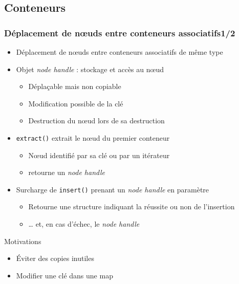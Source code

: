 \documentclass[C++.tex]{subfiles}
\begin{document}
\subsection*{Conteneurs}
\begin{frame}[fragile]
	\frametitle{Déplacement de nœuds entre conteneurs associatifs\titlehfill{}1/2}
	\begin{itemize}
		\item Déplacement de nœuds entre conteneurs associatifs de même type
		\item Objet \textit{node handle} : stockage et accès au nœud
		\begin{itemize}
			\item Déplaçable mais non copiable
			\item Modification possible de la clé
			\item Destruction du nœud lors de sa destruction
		\end{itemize}
		\item \lstinline|extract()| extrait le nœud du premier conteneur
		\begin{itemize}
			\item Nœud identifié par sa clé ou par un itérateur
			\item retourne un \textit{node handle}
		\end{itemize}
		\item Surcharge de \lstinline|insert()| prenant un \textit{node handle} en paramètre
		\begin{itemize}
			\item Retourne une structure indiquant la réussite ou non de l'insertion
			\item \ldots{} et, en cas d'échec, le \textit{node handle}
		\end{itemize}
	\end{itemize}

	\begin{block}{Motivations}
		\begin{itemize}
			\item Éviter des copies inutiles
			\item Modifier une clé dans une map
		\end{itemize}
	\end{block}
\end{frame}
\end{document}
